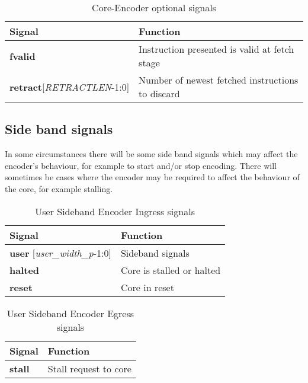 \begin{table}[htp]
    \centering
    \caption{Core-Encoder optional signals}
    \label{tab:ingressfetch}
    \begin{tabulary}{\textwidth}{|l|l|}
        \hline
        \textbf {Signal} & \textbf {Function} \\
        \hline
        \textbf {fvalid} & Instruction presented is valid at fetch stage \\
        \hline
        \textbf {retract}[\textit{RETRACTLEN}-1:0] & Number of newest fetched instructions to discard \\
        \hline
    \end{tabulary}
\end{table}

\subsection {Side band signals}

In some circumstances there will be some side band signals which may
affect the encoder's behaviour, for example to start and/or stop
encoding. There will sometimes be cases where the encoder may be
required to affect the behaviour of the core, for example stalling.

\begin{table}[htp]
    \centering
    \caption{User Sideband Encoder Ingress signals}
    \label{tab:ingress-side-band}
    \begin{tabulary}{\textwidth}{|l|l|}
        \hline
        \textbf {Signal} & \textbf {Function} \\
       \hline
        \textbf {user} [\textit{user\_width\_p}-1:0] &  Sideband signals \\
        \hline
        \textbf {halted}& Core is stalled or halted \\
        \hline
        \textbf {reset}& Core in reset \\
        \hline
    \end{tabulary}
\end{table}

\begin{table}[htp]
    \centering
    \caption{User Sideband Encoder Egress signals}
    \label{tab:ingress-side-band}
    \begin{tabulary}{\textwidth}{|l|l|}
        \hline
        \textbf {Signal} & \textbf {Function} \\
        \hline
        \textbf {stall}& Stall request to core \\
        \hline
    \end{tabulary}
\end{table}


